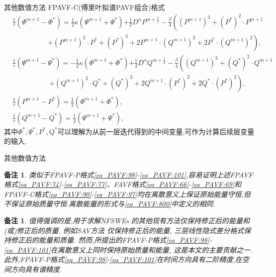 \documentclass[aspectratio=169]{beamer}
\newtheorem{remark}[theorem]{备注} %
\numberwithin{theorem}{section} %
\begin{document}
\begin{frame}{其他数值方法}
	FPAVF-C(傅里叶拟谱PAVF组合)格式
	\begin{align}
	&\frac{1}{\tau}\left(\varPhi^{m+1}-\varPhi^{*}\right)=\frac{1}{2}\kappa (\Psi^{m+1}+\Psi^{*}){+\frac{1}{2}D^{\alpha} P^{m+\frac{1}{2}}}-\frac{\beta}{4}\left((P^{m+1})^3+(P^{*})^{2}\cdot P^{m+1}\right.\nonumber\\
			&~~~~~~~~~~~~~~~~~~~~~~~\left.+(P^{m+1})^{2}\cdot P^{*}+ (P^{*})^{3}+2 P^{m+1}\cdot (Q^{m+1})^{2}+2 P^{*}\cdot (Q^{m+1})^{2}\right),\label{eq_PAVF:94}\\
	&\frac{1}{\tau}\left(\Psi^{m+1}-\Psi^{*}\right)=-\frac{1}{2}\kappa (\varPhi^{m+1}+\varPhi^{*}){+\frac{1}{2}D^{\alpha} Q^{m+\frac{1}{2}}}-\frac{\beta}{4}\left((Q^{m+1})^3+(Q^{*})^{2}\cdot Q^{m+1}\right.\nonumber\\
			&~~~~~~~~~~~~~~~~~~~~~~~~\left.+(Q^{m+1})^{2}\cdot Q^{*}+ (Q^{*})^{3}+2 Q^{m+1}\cdot (P^{*})^{2}+2 Q^{*}\cdot (P^{*})^{2}\right),\label{eq_PAVF:95}\\
	&\frac{1}{\tau}\left(P^{m+1}-P^{*}\right)=\frac{1}{2}(\varPhi^{m+1}+\varPhi^{*}),\label{eq_PAVF:96}\\
	&\frac{1}{\tau}\left(Q^{m+1}-Q^{*}\right)=\frac{1}{2}(\Psi^{m+1}+\Psi^{*}),\label{eq_PAVF:97}
	\end{align}
	其中$\Phi^*, \Psi^*, P^*, Q^*$可以理解为从前一层迭代得到的中间变量,可作为计算后续层变量的输入.
\end{frame}
\begin{frame}{其他数值方法}

	\begin{remark}\label{rk_PAVF:1}
		类似于FPAVF-P格式\eqref{eq_PAVF:98}-\eqref{eq_PAVF:101},容易证明上述FPAVF格式\eqref{eq_PAVF:74}-\eqref{eq_PAVF:77}、FAVF格式\eqref{eq_PAVF:66}-\eqref{eq_PAVF:69}和FPAVF-C格式\eqref{eq_PAVF:90}-\eqref{eq_PAVF:97}均在离散意义上保证原始能量守恒,但不保证原始质量守恒.离散能量的形式与\eqref{eq_PAVF:800}中定义的相同.
		\end{remark}
		
		\begin{remark}\label{rk_PAVF:2}
		值得强调的是,用于求解NFSWEs  的其他现有方法仅保持修正后的能量和(或)修正后的质量.
		例如SAV方法 \cite{chengConvergenceEnergyconservingScheme2022}仅保持修正后的能量,
		三层线性隐式差分格式\cite{ranLinearlyImplicitConservative2016}保持修正后的能量和质量.
		然而,所提出的FPAVF-P格式\eqref{eq_PAVF:98}-\eqref{eq_PAVF:101}在离散意义上同时保持原始质量和能量, 这是本文的主要贡献之一.
		此外,FPAVF-P格式\eqref{eq_PAVF:98}-\eqref{eq_PAVF:101}在时间方向具有二阶精度,在空间方向具有谱精度.
		\end{remark}
\end{frame}
\end{document}
